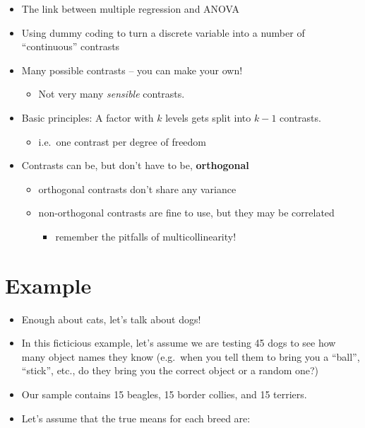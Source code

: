 \documentclass[]{article}
\begin{document}
\begin{itemize}
\itemsep1pt\parskip0pt
\item
  The link between multiple regression and ANOVA
\item
  Using dummy coding to turn a discrete variable into a number of
  ``continuous'' contrasts
\item
  Many possible contrasts -- you can make your own!

  \begin{itemize}
  \itemsep1pt\parskip0pt
  \item
    Not very many \emph{sensible} contrasts.
  \end{itemize}
\item
  Basic principles: A factor with $k$ levels gets split into $k-1$
  contrasts.

  \begin{itemize}
  \itemsep1pt\parskip0pt
  \item
    i.e.~one contrast per degree of freedom
  \end{itemize}
\item
  Contrasts can be, but don't have to be, \textbf{orthogonal}

  \begin{itemize}
  \itemsep1pt\parskip0pt
  \item
    orthogonal contrasts don't share any variance
  \item
    non-orthogonal contrasts are fine to use, but they may be correlated

    \begin{itemize}
    \itemsep1pt\parskip0pt
    \item
      remember the pitfalls of multicollinearity!
    \end{itemize}
  \end{itemize}
\end{itemize}

\section{Example}\label{example}

\begin{itemize}
\itemsep1pt\parskip0pt
\item
  Enough about cats, let's talk about dogs!
\item
  In this ficticious example, let's assume we are testing 45 dogs to see
  how many object names they know (e.g.~when you tell them to bring you
  a ``ball'', ``stick'', etc., do they bring you the correct object or a
  random one?)
\item
  Our sample contains 15 beagles, 15 border collies, and 15 terriers.
\item
  Let's assume that the true means for each breed are:
\end{itemize}
\end{document}
